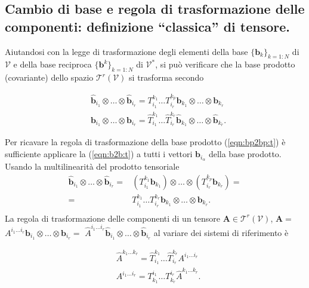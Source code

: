 % 
 \subsection{Cambio di base e regola di trasformazione delle componenti: definizione ``classica'' di tensore.} 
%
 Aiutandosi con la legge di trasformazione degli elementi della base $\{ \bm{b}_k \}_{k=1:N}$ di $\mathcal{V}$ 
 e della base reciproca $\{ \bm{b}^k \}_{k=1:N}$ di $\mathcal{V}^*$, si può verificare
  che la base prodotto (covariante) dello spazio $\mathcal{T}^r(\mathcal{V})$ si trasforma secondo
\begin{fBox}
\begin{equation}\label{eqn:bp2bp:t}
\begin{aligned}
 &  \bm{\hat{b}}_{i_1} \otimes \dots \otimes \bm{\hat{b}}_{i_r} = 
  T^{k_1}_{i_1}\dots T^{k_p}_{i_r}
  \bm{b}_{k_1} \otimes \dots \otimes \bm{b}_{k_r} \\
  &  \bm{b}_{i_1} \otimes \dots \otimes \bm{b}_{i_r} = 
  \hat{T}^{k_1}_{i_1}\dots \hat{T}^{k_r}_{i_r}
  \bm{\hat{b}}_{k_1} \otimes \dots \otimes \bm{\hat{b}}_{k_r} .
\end{aligned}
\end{equation}
\end{fBox}
 Per ricavare la regola di trasformazione della base prodotto (\ref{eqn:bp2bp:t}) è sufficiente applicare la (\ref{eqn:b2b:t}) a tutti i vettori $\bm{b}_{i_\alpha}$ della base prodotto.  Usando la multilinearità del prodotto tensoriale
 \begin{equation}
 \begin{aligned}
  \bm{\hat{b}}_{i_1} \otimes \dots \otimes \bm{\hat{b}}_{i_r} = &
  ( T^{k_1}_{i_1}\bm{b}_{k_1} ) \otimes \dots \otimes ( T^{k_p}_{i_r}\bm{b}_{k_r}) = \\
  = & T^{k_1}_{i_1}\dots T^{k_r}_{i_r}
   \bm{b}_{k_1} \otimes \dots \otimes \bm{b}_{k_r} . \\
 \end{aligned}
 \end{equation}
%
 La regola di trasformazione delle componenti di un tensore $\bm{A} \in \mathcal{T}^r(\mathcal{V})$, $\bm{A} =$ $A^{i_1 \dots i_r} \bm{b}_{i_1} \otimes \dots \otimes \bm{b}_{i_r} =$ $\hat{A}^{i_1 \dots i_r} \bm{\hat{b}}_{i_1} \otimes \dots \otimes \bm{\hat{b}}_{i_r} $ al variare dei sistemi di riferimento è
\begin{fBox}
\begin{equation}\label{eqn:t2t:t}
\begin{aligned}
 &  \hat{A}^{k_1 \dots k_r} = 
  \hat{T}^{k_1}_{i_1}\dots \hat{T}^{k_r}_{i_r} A^{i_1 \dots i_r} \\
 &  A^{i_1 \dots i_r} = 
  T^{i_1}_{k_1}\dots T^{i_r}_{k_r} 
  \hat{A}^{k_1 \dots k_r} .
\end{aligned}
\end{equation}
\end{fBox}
